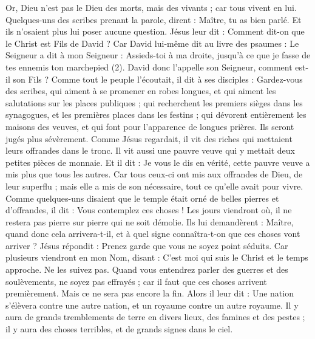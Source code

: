 \begin{multicols}{2}
Or, Dieu n'est pas le Dieu des morts, mais des vivants ; car tous vivent en lui.
Quelques-uns des scribes prenant la parole, dirent : Maître, tu as bien parlé.
Et ils n’osaient plus lui poser aucune question.
Jésus leur dit : Comment dit-on que le Christ est Fils de David ?
Car David lui-même dit au livre des psaumes : Le Seigneur a dit à mon Seigneur : Assieds-toi à ma droite,
jusqu'à ce que je fasse de tes ennemis ton marchepied (2).
David donc l'appelle son Seigneur, comment est-il son Fils ?
Comme tout le peuple l’écoutait, il dit à ses disciples :
Gardez-vous des scribes, qui aiment à se promener en robes longues, et qui aiment les salutations sur les places publiques ; qui recherchent les premiers sièges dans les synagogues, et les premières places dans les festins ;
qui dévorent entièrement les maisons des veuves, et qui font pour l’apparence de longues prières. Ils seront jugés plus sévèrement.
\VerseOne{}Comme Jésus regardait, il vit des riches qui mettaient leurs offrandes dans le tronc.
Il vit aussi une pauvre veuve qui y mettait deux petites pièces de monnaie.
Et il dit : Je vous le dis en vérité, cette pauvre veuve a mis plus que tous les autres.
Car tous ceux-ci ont mis aux offrandes de Dieu, de leur superflu ; mais elle a mis de son nécessaire, tout ce qu'elle avait pour vivre.
Comme quelques-uns disaient que le temple était orné de belles pierres et d’offrandes, il dit :
Vous contemplez ces choses ! Les jours viendront où, il ne restera pas pierre sur pierre qui ne soit démolie.
Ils lui demandèrent : Maître, quand donc cela arrivera-t-il, et à quel signe connaîtra-t-on que ces choses vont arriver ?
Jésus répondit : Prenez garde que vous ne soyez point séduits. Car plusieurs viendront en mon Nom, disant : C’est moi qui suis le Christ et le temps approche. Ne les suivez pas.
Quand vous entendrez parler des guerres et des soulèvements, ne soyez pas effrayés ; car il faut que ces choses arrivent premièrement. Mais ce ne sera pas encore la fin.
Alors il leur dit : Une nation s'élèvera contre une autre nation, et un royaume contre un autre royaume.
Il y aura de grands tremblements de terre en divers lieux, des famines et des pestes ; il y aura des choses terribles, et de grands signes dans le ciel.

\end{multicols}
